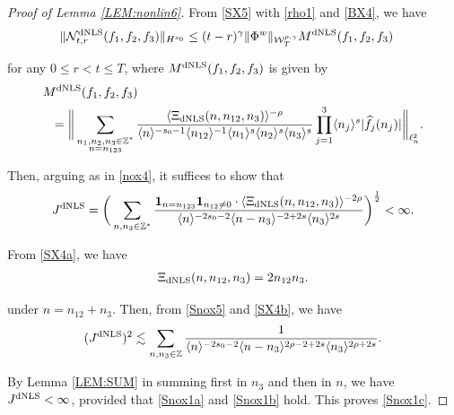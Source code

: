 \documentclass[letterpaper, 11pt,  reqno]{amsart}
\newcommand{\1}{\hspace{0.5mm}\text{I}\hspace{0.5mm}}
\newcommand{\noi}{\noindent}
\newcommand{\Z}{\mathbb{Z}}
\newcommand{\g}{\gamma}
\newcommand{\ft}{\widehat}
\renewcommand{\l}{\ell}
\newcommand{\les}{\lesssim}
\newcommand{\jb}[1]
{\langle #1 \rangle}
\newcommand{\ind}{\mathbf 1}
\newcommand{\NN}{\mathcal{N}}
\newcommand{\W}{\mathcal{W}}
\newcommand{\dNLS}{\text{\rm dNLS} }
\numberwithin{equation}{section}
\numberwithin{theorem}{section}
\begin{document}
\begin{proof}[Proof of Lemma \ref{LEM:nonlin6}]





From \eqref{SX5} with \eqref{rho1} and \eqref{BX4}, we have
\begin{align*}
 \| \NN^\dNLS_{t, r}(f_1, f_2, f_3)\|_{H^{s_0}}
&  \le
(t-r)^\g \|\Phi^w\|_{  \W^{\rho,\g}_T}M^\dNLS(f_1, f_2, f_3)
\end{align*}

\noi
for any $0 \le r < t \le T$, 
where $M^\dNLS(f_1, f_2, f_3)$ is given by 
\begin{align*}
& M^\dNLS(f_1, f_2, f_3)\\
& \ \  =\bigg\|
\sum_{\substack{n_1, n_2, n_3 \in \Z^*\\n = n_{123}}}
\frac{\jb{\Xi_\dNLS(n, n_{12}, n_3)}^{-\rho}}{\jb{n}^{-s_0 - 1}
\jb{n_{12}}^{-1}
\jb{n_1}^{s}\jb{n_2}^{s}\jb{n_3}^{s}} 
\prod_{j = 1}^3\jb{n_j}^s|\ft f_j(n_j)|
\bigg\|_{\l^2_n}.
\end{align*}


\noi
Then, arguing as in \eqref{nox4}, 
it suffices to show that 
\begin{align}
 J^\dNLS
= \bigg(\sum_{n,  n_3 \in \Z^*}
\frac{\ind_{n = n_{123}}
\ind_{n_{12} \ne0}
\cdot \jb{\Xi_\dNLS(n, n_{12}, n_3)}^{-2\rho}}
{\jb{n}^{-2s_0 - 2}
\jb{n - n_3}^{-2+2s}
\jb{n_3}^{2s}} 
\bigg)^\frac 12 < \infty.
\label{Snox5}
\end{align}







From \eqref{SX4a}, we have
\begin{align}
\Xi_\dNLS(n, n_{12}, n_3)
=  2 n_{12} n_3.
\label{SX4b}
\end{align}

\noi
 under $n = n_{12} + n_3$.
Then, from \eqref{Snox5}
and \eqref{SX4b}, we have
\begin{align*}
( J^\dNLS)^2
\les  \sum_{n,  n_3 \in \Z}
\frac{1}
{\jb{n}^{-2s_0 - 2}
\jb{n - n_3}^{2\rho-2+2s}
\jb{n_3}^{2\rho+2s}} .
\end{align*}



\noi
By
Lemma \ref{LEM:SUM}
in summing first in $n_3$ and then in $n$, we have $J^\dNLS < \infty$, 
provided that \eqref{Snox1a}
and \eqref{Snox1b} hold.
This proves 
\eqref{Snox1c}.
\end{proof}
\end{document}

